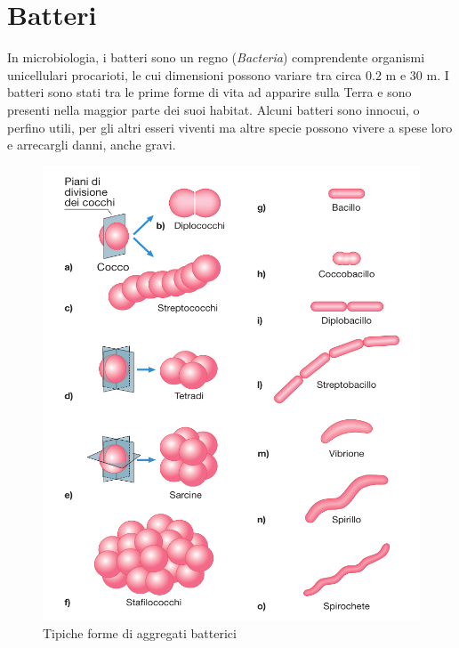 \documentclass[../main.tex]{subfiles}
\begin{document}
\section{Batteri}

In \Gls{microbiologia}, i batteri sono un regno (\textit{Bacteria}) comprendente organismi unicellulari procarioti, le cui dimensioni possono variare tra circa $0.2$ \micro m e $30$ \micro m.\cite{goker_2024} I batteri sono stati tra le prime forme di vita ad apparire sulla Terra e sono presenti nella maggior parte dei suoi habitat. Alcuni batteri sono innocui, o perfino utili\cite{mccutcheon_2021}, per gli altri esseri viventi ma altre specie possono vivere a spese loro e arrecargli danni, anche gravi.\cite{johnson_2018}
\medskip

\begin{figure}
	\includegraphics[keepaspectratio, width=\linewidth]{images/batteri_morfologia.png}
	\caption[Tipiche forme di aggregati batterici]{
		Tipiche forme di aggregati batterici \cite{deho_galli_2020}}
	\label{fig:bacteria_morphology}
\end{figure}
\end{document}
